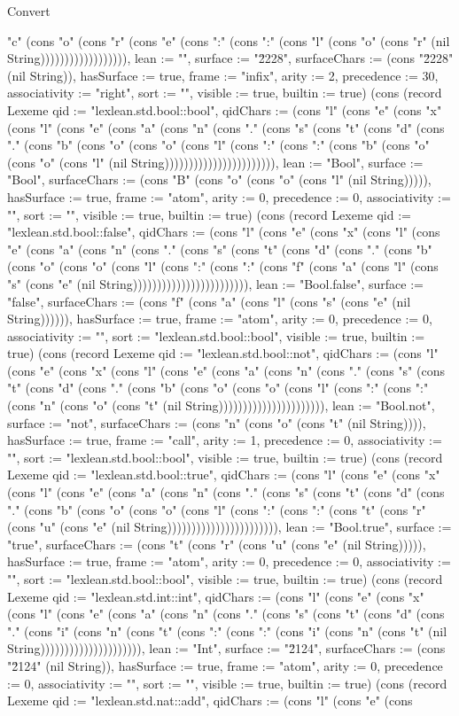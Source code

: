 \begin{lexlean}{Convert}
\begin{semanticmodule}
{"c" (cons "o" (cons "r" (cons "e" (cons ":" (cons ":" (cons "l" (cons "o" (cons "r" (nil String)))))))))))))))))), lean := "", surface := "\u2228", surfaceChars := (cons "\u2228" (nil String)), hasSurface := true, frame := "infix", arity := 2, precedence := 30, associativity := "right", sort := "", visible := true, builtin := true}) (cons (record Lexeme {qid := "lexlean.std.bool::bool", qidChars := (cons "l" (cons "e" (cons "x" (cons "l" (cons "e" (cons "a" (cons "n" (cons "." (cons "s" (cons "t" (cons "d" (cons "." (cons "b" (cons "o" (cons "o" (cons "l" (cons ":" (cons ":" (cons "b" (cons "o" (cons "o" (cons "l" (nil String))))))))))))))))))))))), lean := "Bool", surface := "Bool", surfaceChars := (cons "B" (cons "o" (cons "o" (cons "l" (nil String))))), hasSurface := true, frame := "atom", arity := 0, precedence := 0, associativity := "", sort := "", visible := true, builtin := true}) (cons (record Lexeme {qid := "lexlean.std.bool::false", qidChars := (cons "l" (cons "e" (cons "x" (cons "l" (cons "e" (cons "a" (cons "n" (cons "." (cons "s" (cons "t" (cons "d" (cons "." (cons "b" (cons "o" (cons "o" (cons "l" (cons ":" (cons ":" (cons "f" (cons "a" (cons "l" (cons "s" (cons "e" (nil String)))))))))))))))))))))))), lean := "Bool.false", surface := "false", surfaceChars := (cons "f" (cons "a" (cons "l" (cons "s" (cons "e" (nil String)))))), hasSurface := true, frame := "atom", arity := 0, precedence := 0, associativity := "", sort := "lexlean.std.bool::bool", visible := true, builtin := true}) (cons (record Lexeme {qid := "lexlean.std.bool::not", qidChars := (cons "l" (cons "e" (cons "x" (cons "l" (cons "e" (cons "a" (cons "n" (cons "." (cons "s" (cons "t" (cons "d" (cons "." (cons "b" (cons "o" (cons "o" (cons "l" (cons ":" (cons ":" (cons "n" (cons "o" (cons "t" (nil String)))))))))))))))))))))), lean := "Bool.not", surface := "not", surfaceChars := (cons "n" (cons "o" (cons "t" (nil String)))), hasSurface := true, frame := "call", arity := 1, precedence := 0, associativity := "", sort := "lexlean.std.bool::bool", visible := true, builtin := true}) (cons (record Lexeme {qid := "lexlean.std.bool::true", qidChars := (cons "l" (cons "e" (cons "x" (cons "l" (cons "e" (cons "a" (cons "n" (cons "." (cons "s" (cons "t" (cons "d" (cons "." (cons "b" (cons "o" (cons "o" (cons "l" (cons ":" (cons ":" (cons "t" (cons "r" (cons "u" (cons "e" (nil String))))))))))))))))))))))), lean := "Bool.true", surface := "true", surfaceChars := (cons "t" (cons "r" (cons "u" (cons "e" (nil String))))), hasSurface := true, frame := "atom", arity := 0, precedence := 0, associativity := "", sort := "lexlean.std.bool::bool", visible := true, builtin := true}) (cons (record Lexeme {qid := "lexlean.std.int::int", qidChars := (cons "l" (cons "e" (cons "x" (cons "l" (cons "e" (cons "a" (cons "n" (cons "." (cons "s" (cons "t" (cons "d" (cons "." (cons "i" (cons "n" (cons "t" (cons ":" (cons ":" (cons "i" (cons "n" (cons "t" (nil String))))))))))))))))))))), lean := "Int", surface := "\u2124", surfaceChars := (cons "\u2124" (nil String)), hasSurface := true, frame := "atom", arity := 0, precedence := 0, associativity := "", sort := "", visible := true, builtin := true}) (cons (record Lexeme {qid := "lexlean.std.nat::add", qidChars := (cons "l" (cons "e" (cons }
\end{semanticmodule}
\end{lexlean}

